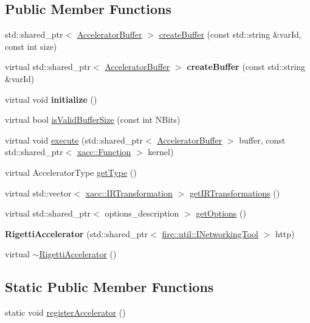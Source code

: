 \subsection*{Public Member Functions}
\begin{DoxyCompactItemize}
\item 
std\+::shared\+\_\+ptr$<$ \hyperlink{a01625}{Accelerator\+Buffer} $>$ \hyperlink{a01165_a731551c94b1abef40d2cf032e8712df6}{create\+Buffer} (const std\+::string \&var\+Id, const int size)
\item 
\mbox{\label{a01165_ada3ceb986e51ab5aa721f2a08e083cd6}} 
virtual std\+::shared\+\_\+ptr$<$ \hyperlink{a01625}{Accelerator\+Buffer} $>$ {\bfseries create\+Buffer} (const std\+::string \&var\+Id)
\item 
\mbox{\label{a01165_ab8b6af9bb9dcb110201e9ee5cac74b4f}} 
virtual void {\bfseries initialize} ()
\item 
virtual bool \hyperlink{a01165_a61352c07062597aad2393fbeed4cc025}{is\+Valid\+Buffer\+Size} (const int N\+Bits)
\item 
virtual void \hyperlink{a01165_afce7bbd1b0f04300a9920952e9d12ef4}{execute} (std\+::shared\+\_\+ptr$<$ \hyperlink{a01625}{Accelerator\+Buffer} $>$ buffer, const std\+::shared\+\_\+ptr$<$ \hyperlink{a01653}{xacc\+::\+Function} $>$ kernel)
\item 
virtual Accelerator\+Type \hyperlink{a01165_aab0d4674da5273d55407b9ab77cde890}{get\+Type} ()
\item 
virtual std\+::vector$<$ \hyperlink{a01681}{xacc\+::\+I\+R\+Transformation} $>$ \hyperlink{a01165_a443683a1dfb000603c640b2ee303cf66}{get\+I\+R\+Transformations} ()
\item 
virtual std\+::shared\+\_\+ptr$<$ options\+\_\+description $>$ \hyperlink{a01165_a9ee9e62aecbccf193894ca3388676f9f}{get\+Options} ()
\item 
\mbox{\label{a01165_aa92ba39441ec9c261fbddee23a84d6ac}} 
{\bfseries Rigetti\+Accelerator} (std\+::shared\+\_\+ptr$<$ \hyperlink{a01609}{fire\+::util\+::\+I\+Networking\+Tool} $>$ http)
\item 
virtual \hyperlink{a01165_a7c86895d1c29afa8b7e18476144a3fcf}{$\sim$\+Rigetti\+Accelerator} ()
\end{DoxyCompactItemize}
\subsection*{Static Public Member Functions}
\begin{DoxyCompactItemize}
\item 
static void \hyperlink{a01165_a757d25e0e7fe0f53635b97a97d74265c}{register\+Accelerator} ()
\end{DoxyCompactItemize}
